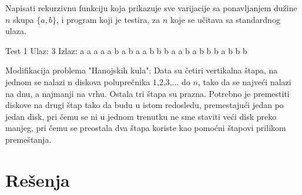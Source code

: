 \begin{Exercise}[label=116]
Napisati rekurzivnu funkciju koja prikazuje sve varijacije sa
   ponavljanjem dužine $n$ skupa $\{a, b\}$, i program koji je
   testira, za $n$ koje se učitava sa standardnog ulaza.

\begin{miditest}
\begin{test}{Test 1}
Ulaz:    3
Izlaz:   a a a
         a a b
         a b a
         a b b
         b a a
         b a b
         b b a
         b b b
\end{test}
\end{miditest}
\end{Exercise}

\begin{Exercise}[label=117]
Modifikacija problema "Hanojskih kula": Data su četiri
  vertikalna štapa, na jednom se nalazi n diskova poluprečnika
  $1$,$2$,$3$,... do $n$, tako da se najveći nalazi na dnu, a
  najmanji na vrhu. Ostala tri štapa su prazna. Potrebno je
  premestiti diskove na drugi štap tako da budu u istom redosledu,
  premestajući jedan po jedan disk, pri čemu se ni u jednom
  trenutku ne sme staviti veći disk preko manjeg, pri čemu se
  preostala dva štapa koriste kao pomoćni štapovi prilikom
  premeštanja.

\end{Exercise}


\section{Rešenja}
\shipoutAnswer
